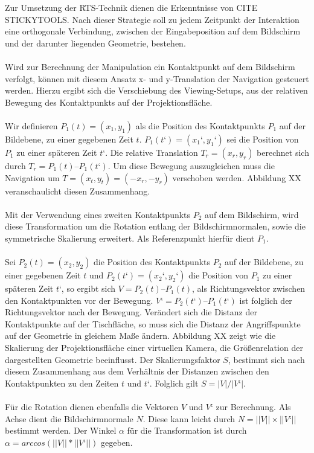 Zur Umsetzung der RTS-Technik dienen die Erkenntnisse von CITE STICKYTOOLS. Nach dieser Strategie soll zu jedem Zeitpunkt der Interaktion eine orthogonale Verbindung, zwischen der Eingabeposition auf dem Bildschirm und der darunter liegenden Geometrie, bestehen.
\\\\
Wird zur Berechnung der Manipulation ein Kontaktpunkt auf dem Bildschirm verfolgt, können mit diesem Ansatz x- und y-Translation der Navigation gesteuert werden. Hierzu ergibt sich die Verschiebung des Viewing-Setups, aus der relativen Bewegung des Kontaktpunkts auf der Projektionsfläche. 
\\\\
Wir definieren $P_1(t) = (x_1, y_1)$ als die Position des Kontaktpunkts $P_1$ auf der Bildebene, zu einer gegebenen Zeit $t$. $P_1(t‘) = (x_1‘, y_1‘)$ sei die Position von $P_1$ zu einer späteren Zeit $t‘$. Die relative Translation $T_r = (x_r, y_r)$ berechnet sich durch $T_r = P_1(t) – P_1(t‘)$. Um diese Bewegung auszugleichen muss die Navigation um $T = (x_t, y_t) = (-x_r, -y_r)$ verschoben werden. Abbildung XX veranschaulicht diesen Zusammenhang.
\\\\
Mit der Verwendung eines zweiten Kontaktpunkts $P_2$ auf dem Bildschirm, wird diese Transformation um die Rotation entlang der Bildschirmnormalen, sowie die symmetrische Skalierung erweitert. Als Referenzpunkt hierfür dient $P_1$.
\\\\
Sei $P_2(t) = (x_2, y_2)$ die Position des Kontaktpunkts $P_2$ auf der Bildebene, zu einer gegebenen Zeit $t$ und $P_2(t‘) = (x_2‘, y_2‘)$ die Position von $P_1$ zu einer späteren Zeit $t‘$, so ergibt sich $V = P_2(t) – P_1(t)$, als Richtungsvektor zwischen den Kontaktpunkten vor der Bewegung. $V‘ = P_2(t‘) – P_1(t‘)$ ist folglich der Richtungsvektor nach der Bewegung. Verändert sich die Distanz der Kontaktpunkte auf der Tischfläche, so muss sich die Distanz der Angriffspunkte auf der Geometrie in gleichem Maße ändern. Abbildung XX zeigt wie die Skalierung der Projektionsfläche einer virtuellen Kamera, die Größenrelation der dargestellten Geometrie beeinflusst. Der Skalierungsfaktor $S$, bestimmt sich nach diesem Zusammenhang aus dem Verhältnis der Distanzen zwischen den Kontaktpunkten zu den Zeiten $t$ und $t‘$. Folglich gilt $S = |V| / |V‘|$. 
\\\\
Für die Rotation dienen ebenfalls die Vektoren $V$ und $V‘$ zur Berechnung. Als Achse dient die Bildschirmnormale $N$. Diese kann leicht durch $N = ||V|| \times ||V‘||$ bestimmt werden. Der Winkel $\alpha$ für die Transformation ist durch $\alpha = arccos(||V|| * ||V‘||)$ gegeben.



